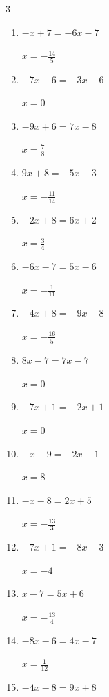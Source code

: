 \begin{multicols}{3}
\begin{enumerate}
  \item $-x+7=-6x-7$

        $\displaystyle x=-\frac{14}{5}$

  \item $-7x-6=-3x-6$

        $\displaystyle x=0$

  \item $-9x+6=7x-8$

        $\displaystyle x=\frac{7}{8}$

  \item $9x+8=-5x-3$

        $\displaystyle x=-\frac{11}{14}$

  \item $-2x+8=6x+2$

        $\displaystyle x=\frac{3}{4}$

  \item $-6x-7=5x-6$

        $\displaystyle x=-\frac{1}{11}$

\columnbreak %

  \item $-4x+8=-9x-8$

        $\displaystyle x=-\frac{16}{5}$

  \item $8x-7=7x-7$

        $\displaystyle x=0$

  \item $-7x+1=-2x+1$

        $\displaystyle x=0$

  \item $-x-9=-2x-1$

        $\displaystyle x=8$

  \item $-x-8=2x+5$

        $\displaystyle x=-\frac{13}{3}$

  \item $-7x+1=-8x-3$

        $\displaystyle x=-4$

  \item $x-7=5x+6$

        $\displaystyle x=-\frac{13}{4}$

  \item $-8x-6=4x-7$

        $\displaystyle x=\frac{1}{12}$

  \item $-4x-8=9x+8$


\end{enumerate}
\end{multicols}
